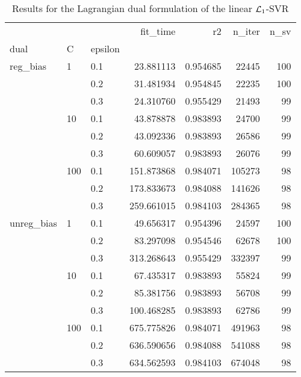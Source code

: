 \begin{table}[H]
\centering
\caption{Results for the Lagrangian dual formulation of the linear $\protect \mathcal{L}_1$-SVR}
\label{linear_lagrangian_dual_l1_svr_cv_results}
\begin{tabular}{lllrrrr}
\toprule
           &     &     &    fit\_time &        r2 &  n\_iter &  n\_sv \\
dual & C & epsilon &             &           &         &       \\
\midrule
reg\_bias & 1   & 0.1 &   23.881113 &  0.954685 &   22445 &   100 \\
           &     & 0.2 &   31.481934 &  0.954845 &   22235 &   100 \\
           &     & 0.3 &   24.310760 &  0.955429 &   21493 &    99 \\
           & 10  & 0.1 &   43.878878 &  0.983893 &   24700 &    99 \\
           &     & 0.2 &   43.092336 &  0.983893 &   26586 &    99 \\
           &     & 0.3 &   60.609057 &  0.983893 &   26076 &    99 \\
           & 100 & 0.1 &  151.873868 &  0.984071 &  105273 &    98 \\
           &     & 0.2 &  173.833673 &  0.984088 &  141626 &    98 \\
           &     & 0.3 &  259.661015 &  0.984103 &  284365 &    98 \\
unreg\_bias & 1   & 0.1 &   49.656317 &  0.954396 &   24597 &   100 \\
           &     & 0.2 &   83.297098 &  0.954546 &   62678 &   100 \\
           &     & 0.3 &  313.268643 &  0.955429 &  332397 &    99 \\
           & 10  & 0.1 &   67.435317 &  0.983893 &   55824 &    99 \\
           &     & 0.2 &   85.381756 &  0.983893 &   56708 &    99 \\
           &     & 0.3 &  100.468285 &  0.983893 &   62786 &    99 \\
           & 100 & 0.1 &  675.775826 &  0.984071 &  491963 &    98 \\
           &     & 0.2 &  636.590656 &  0.984088 &  541088 &    98 \\
           &     & 0.3 &  634.562593 &  0.984103 &  674048 &    98 \\
\bottomrule
\end{tabular}
\end{table}
